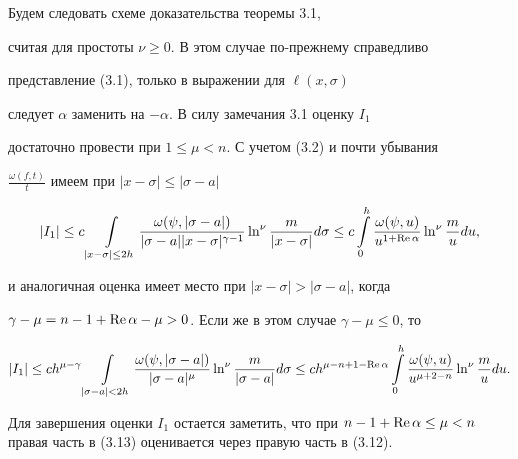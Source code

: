 \begin{pf}


Будем следовать схеме доказательства теоремы 3.1,


считая для простоты $\nu\ge 0$. В этом случае по-прежнему справедливо


представление (3.1), только в выражении для $\ell (x, \sigma)$


следует $\alpha$ заменить на $-\alpha$. В силу замечания 3.1 оценку $I_1$


достаточно провести при $1\le \mu <n$. С учетом (3.2) и почти убывания


$\frac{\omega(f,t)}{t}$ имеем при $|x-\sigma| \le |\sigma-a|$


\begin{equation}


|I_1| \le c \int \limits_{|x-\sigma|\leq 2h} \frac


{\omega(\psi,|\sigma-a|)}{|\sigma-a||x-\sigma|^{\gamma-1}}


\ln^\nu \frac{m}{|x-\sigma|} d\sigma


\le c \int \limits _0^h \frac{\omega(\psi,u)}{u^{1+\re \alpha}} \ln^\nu


\frac{m}{u}du,


\end{equation}


и аналогичная оценка имеет место при $|x-\sigma| > |\sigma -a|$, когда


$\gamma-\mu=n-1+\re\alpha-\mu>0$. Если же в этом случае $\gamma-\mu \le


0$, то


\begin{equation}


|I_1| \le c h^{\mu-\gamma} \int \limits_{|\sigma-a|<2h}


\frac{\omega(\psi,|\sigma-a|)}{|\sigma-a|^\mu} \ln^\nu


\frac{m}{|\sigma-a|} d\sigma \le ch^{\mu-n+1-\re \alpha}


\int \limits_0^h \frac{\omega(\psi,u)}


{u^{\mu+2-n}} \ln^\nu \frac{m}{u} du.


\end{equation}





Для завершения оценки $I_1$ остается заметить, что при $n-1+\re \alpha \le


\mu < n$ правая часть в (3.13) оценивается через правую часть в (3.12).



\end{pf}
